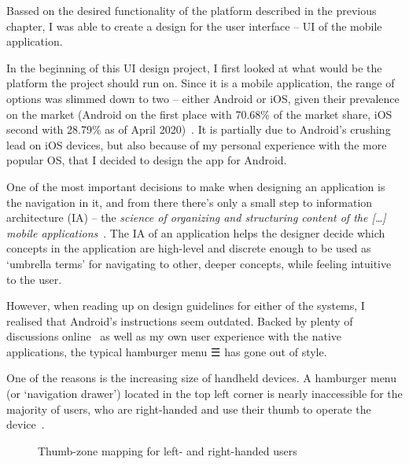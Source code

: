 Bassed on the desired functionality of the platform described in the previous chapter, I was able to create a design for the user interface -- UI of the mobile application.

In the beginning of this UI design project, I first looked at what would be the platform the project should run on.
Since it is a mobile application, the range of options was slimmed down to two -- either Android or iOS,
given their prevalence on the market (Android on the first place with 70.68\% of the market share, iOS second with 28.79\% as of April 2020)~\cite{market-share-mobile-os}.
It is partially due to Android's crushing lead on iOS devices, but also because of my personal experience with the more popular OS, that I decided to design the app for Android.

One of the most important decisions to make when designing an application is the navigation in it, and from there there's only a small step to information architecture (IA) -- the \textit{science of organizing and structuring content of the [\dots] mobile applications}~\cite{information-architecture}.
The IA of an application helps the designer decide which concepts in the application are high-level and discrete enough
to be used as `umbrella terms' for navigating to other, deeper concepts, while feeling intuitive to the user.

However, when reading up on design guidelines for either of the systems, I realised that Android's instructions seem outdated.
Backed by plenty of discussions online~\cite{hamburger-discoverabillity} as well as my own user experience with the native applications, the typical hamburger menu ☰ has gone out of style.

One of the reasons is the increasing size of handheld devices.
A hamburger menu (or `navigation drawer') located in the top left corner is nearly inaccessible for the majority of users, who are right-handed and use their thumb to operate the device~\cite{thumb-zone-article}.

\begin{figure}[h!]
    \centering
    \hfill
    \caption{Thumb-zone mapping for left- and right-handed users~\cite{thumb-zone-img}}
    \label{fig:sign-up-email}
\end{figure}

